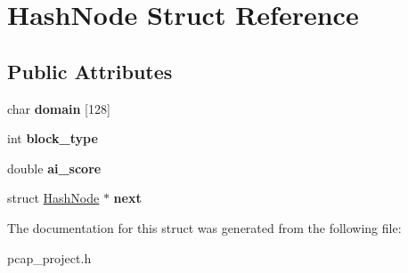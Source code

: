 \hypertarget{structHashNode}{}\section{Hash\+Node Struct Reference}
\label{structHashNode}
\subsection*{Public Attributes}
\begin{DoxyCompactItemize}
\item 
\mbox{\label{structHashNode_a2bb9b3e4a42a926bd1e89ad5089a37de}} 
char {\bfseries domain} \mbox{[}128\mbox{]}
\item 
\mbox{\label{structHashNode_af34d1fb1150854d6bd66774f27ebfc6c}} 
int {\bfseries block\+\_\+type}
\item 
\mbox{\label{structHashNode_a5091e97f375e15f41688972f36e7f7d2}} 
double {\bfseries ai\+\_\+score}
\item 
\mbox{\label{structHashNode_a3213171b5cdc2bfab119ce74c9971e36}} 
struct \mbox{\hyperlink{structHashNode}{Hash\+Node}} $\ast$ {\bfseries next}
\end{DoxyCompactItemize}


The documentation for this struct was generated from the following file\+:\begin{DoxyCompactItemize}
\item 
pcap\+\_\+project.\+h\end{DoxyCompactItemize}
